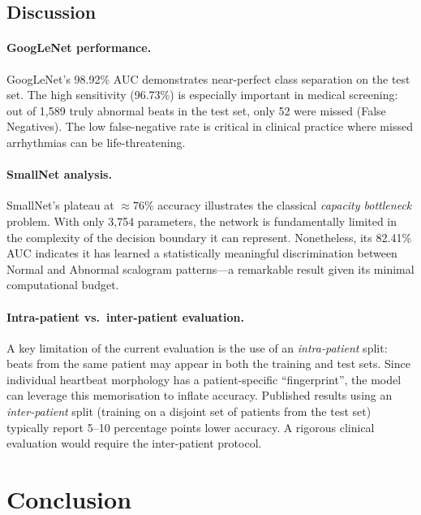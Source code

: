 \documentclass[12pt,a4paper]{article}
\begin{document}
\subsection{Discussion}

\paragraph{GoogLeNet performance.}
GoogLeNet's 98.92\% AUC demonstrates near-perfect class separation on the
test set.  The high sensitivity (96.73\%) is especially important in medical
screening: out of 1,589 truly abnormal beats in the test set, only 52 were
missed (False Negatives).  The low false-negative rate is critical in clinical
practice where missed arrhythmias can be life-threatening.

\paragraph{SmallNet analysis.}
SmallNet's plateau at $\approx 76\%$ accuracy illustrates the classical
\emph{capacity bottleneck} problem.  With only 3,754 parameters, the network
is fundamentally limited in the complexity of the decision boundary it can
represent.  Nonetheless, its 82.41\% AUC indicates it has learned a
statistically meaningful discrimination between Normal and Abnormal scalogram
patterns---a remarkable result given its minimal computational budget.

\paragraph{Intra-patient vs.\ inter-patient evaluation.}
A key limitation of the current evaluation is the use of an
\emph{intra-patient} split: beats from the same patient may appear in both the
training and test sets.  Since individual heartbeat morphology has a
patient-specific ``fingerprint'', the model can leverage this memorisation to
inflate accuracy.  Published results using an \emph{inter-patient} split
(training on a disjoint set of patients from the test set) typically report
5--10 percentage points lower accuracy.  A rigorous clinical evaluation would
require the inter-patient protocol.

\section{Conclusion}
\end{document}
